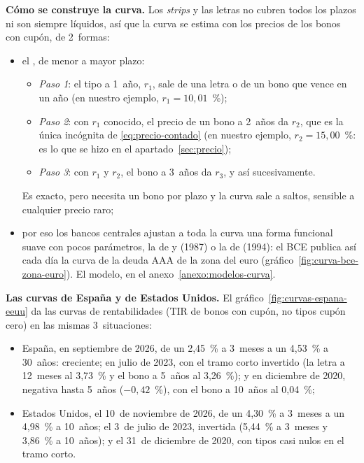 \documentclass[11pt]{article}
\begin{document}
\begin{anotaciones}
\textbf{Cómo se construye la curva.} Los \emph{strips} y las letras no cubren todos los plazos ni son siempre líquidos, así que la curva se estima con los precios de los bonos con cupón, de 2~formas:
\begin{itemize}
\item el , de menor a mayor plazo:
  \begin{itemize}
  \item \emph{Paso 1}: el tipo a 1~año, $r_1$, sale de una letra o de un bono que vence en un año (en nuestro ejemplo, $r_1=10{,}01$~\%);
  \item \emph{Paso 2}: con $r_1$ conocido, el precio de un bono a 2~años da $r_2$, que es la única incógnita de \eqref{eq:precio-contado} (en nuestro ejemplo, $r_2=15{,}00$~\%: es lo que se hizo en el apartado~\ref{sec:precio});
  \item \emph{Paso 3}: con $r_1$ y $r_2$, el bono a 3~años da $r_3$, y así sucesivamente.
  \end{itemize}
  Es exacto, pero necesita un bono por plazo y la curva sale a saltos, sensible a cualquier precio raro;
\item por eso los bancos centrales ajustan a toda la curva una forma funcional suave con pocos parámetros, la de  y  (1987) o la de  (1994): el BCE publica así cada día la curva de la deuda AAA de la zona del euro (gráfico~\ref{fig:curva-bce-zona-euro}). El modelo, en el anexo~\ref{anexo:modelos-curva}.
\end{itemize}
\end{anotaciones}

\begin{anotaciones}
\textbf{Las curvas de España y de Estados Unidos.} El gráfico~\ref{fig:curvas-espana-eeuu} da las curvas de rentabilidades (TIR de bonos con cupón, no tipos cupón cero) en las mismas 3~situaciones:
\begin{itemize}
\item España, en septiembre de 2026, de un 2,45~\% a 3~meses a un 4,53~\% a 30~años: creciente; en julio de 2023, con el tramo corto invertido (la letra a 12~meses al 3,73~\% y el bono a 5~años al 3,26~\%); y en diciembre de 2020, negativa hasta 5~años ($-0{,}42$~\%), con el bono a 10~años al 0,04~\%\nocite{BdE2026BE22};
\item Estados Unidos, el 10~de noviembre de 2026, de un 4,30~\% a 3~meses a un 4,98~\% a 10~años; el 3~de julio de 2023, invertida (5,44~\% a 3~meses y 3,86~\% a 10~años); y el 31~de diciembre de 2020, con tipos casi nulos en el tramo corto\nocite{UST2026ParYield}.
\end{itemize}
\begin{figuracaja}
\caption{Curvas de rentabilidades de España y de Estados Unidos}\label{fig:curvas-espana-eeuu}
\end{figuracaja}
\end{anotaciones}
\end{document}
